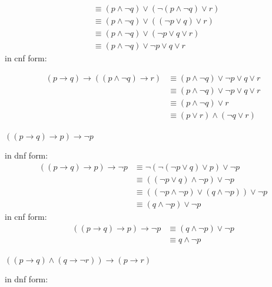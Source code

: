 \documentclass[a4paper,12pt]{article}
\begin{document}
\begin{question}
\begin{subquestion}
\begin{answer}
\begin{align*}
  &\equiv (p \land \lnot q) \lor (\lnot(p \land \lnot q) \lor r)\\
  &\equiv (p \land \lnot q) \lor ((\lnot p \lor q) \lor r)\\
  &\equiv (p \land \lnot q) \lor (\lnot p \lor q \lor r)\\
  &\equiv (p \land \lnot q) \lor \lnot p \lor q \lor r
\end{align*}
in cnf form:\\
\end{answer}
\begin{align*}
  (p \rightarrow q) \rightarrow ((p \land \lnot q) \rightarrow r) &\equiv (p \land \lnot q) \lor \lnot p \lor q \lor r\\
  &\equiv (p \land \lnot q) \lor \lnot p \lor q \lor r\\
  &\equiv (p \land \lnot q) \lor r\\
  &\equiv (p \lor r) \land (\lnot q \lor r)
\end{align*}
\end{subquestion}
\begin{subquestion}
\(((p \rightarrow q) \rightarrow p) \rightarrow \lnot p\)\\
\begin{answer}
in dnf form:\\
\begin{align*}
  ((p \rightarrow q) \rightarrow p) \rightarrow \lnot p &\equiv \lnot(\lnot(\lnot p \lor q) \lor p) \lor \lnot p\\
  &\equiv ((\lnot p \lor q) \land \lnot p) \lor \lnot p\\
  &\equiv ((\lnot p \land \lnot p) \lor (q \land \lnot p)) \lor \lnot p\\
  &\equiv (q \land \lnot p) \lor \lnot p
\end{align*}
in cnf form:\\
\begin{align*}
  ((p \rightarrow q) \rightarrow p) \rightarrow \lnot p &\equiv (q \land \lnot p) \lor \lnot p\\
  &\equiv q \land \lnot p
\end{align*}
\end{answer}
\end{subquestion}
\begin{subquestion}
\(((p \rightarrow q) \land (q \rightarrow \lnot r)) \rightarrow (p \rightarrow r)\)\\
\begin{answer}
in dnf form:\\
\begin{align*}

\end{align*}
\end{answer}
\end{subquestion}
\end{question}
\end{document}

